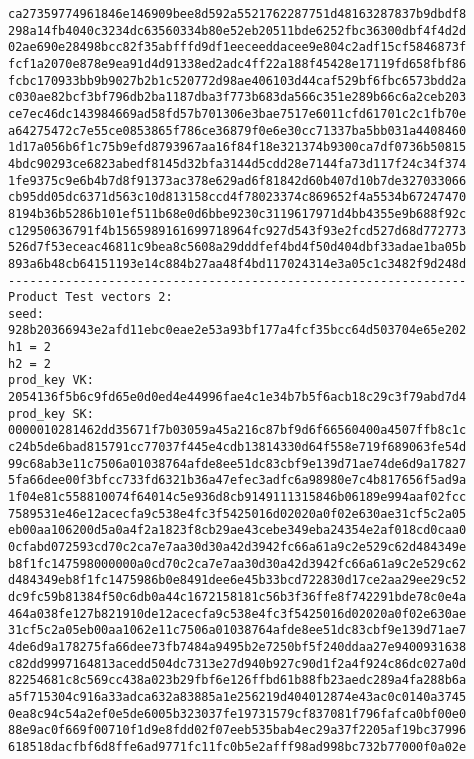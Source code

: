 \documentclass{article}
\begin{document}
{\begin{verbatim}
ca27359774961846e146909bee8d592a5521762287751d48163287837b9dbdf8
298a14fb4040c3234dc63560334b80e52eb20511bde6252fbc36300dbf4f4d2d
02ae690e28498bcc82f35abfffd9df1eeceeddacee9e804c2adf15cf5846873f
fcf1a2070e878e9ea91d4d91338ed2adc4ff22a188f45428e17119fd658fbf86
fcbc170933bb9b9027b2b1c520772d98ae406103d44caf529bf6fbc6573bdd2a
c030ae82bcf3bf796db2ba1187dba3f773b683da566c351e289b66c6a2ceb203
ce7ec46dc143984669ad58fd57b701306e3bae7517e6011cfd61701c2c1fb70e
a64275472c7e55ce0853865f786ce36879f0e6e30cc71337ba5bb031a4408460
1d17a056b6f1c75b9efd8793967aa16f84f18e321374b9300ca7df0736b50815
4bdc90293ce6823abedf8145d32bfa3144d5cdd28e7144fa73d117f24c34f374
1fe9375c9e6b4b7d8f91373ac378e629ad6f81842d60b407d10b7de327033066
cb95dd05dc6371d563c10d813158ccd4f78023374c869652f4a5534b67247470
8194b36b5286b101ef511b68e0d6bbe9230c3119617971d4bb4355e9b688f92c
c12950636791f4b1565989161699718964fc927d543f93e2fcd527d68d772773
526d7f53eceac46811c9bea8c5608a29dddfef4bd4f50d404dbf33adae1ba05b
893a6b48cb64151193e14c884b27aa48f4bd117024314e3a05c1c3482f9d248d
----------------------------------------------------------------
Product Test vectors 2:
seed:
928b20366943e2afd11ebc0eae2e53a93bf177a4fcf35bcc64d503704e65e202
h1 = 2
h2 = 2
prod_key VK:
2054136f5b6c9fd65e0d0ed4e44996fae4c1e34b7b5f6acb18c29c3f79abd7d4
prod_key SK:
0000010281462dd35671f7b03059a45a216c87bf9d6f66560400a4507ffb8c1c
c24b5de6bad815791cc77037f445e4cdb13814330d64f558e719f689063fe54d
99c68ab3e11c7506a01038764afde8ee51dc83cbf9e139d71ae74de6d9a17827
5fa66dee00f3bfcc733fd6321b36a47efec3adfc6a98980e7c4b817656f5ad9a
1f04e81c558810074f64014c5e936d8cb9149111315846b06189e994aaf02fcc
7589531e46e12acecfa9c538e4fc3f5425016d02020a0f02e630ae31cf5c2a05
eb00aa106200d5a0a4f2a1823f8cb29ae43cebe349eba24354e2af018cd0caa0
0cfabd072593cd70c2ca7e7aa30d30a42d3942fc66a61a9c2e529c62d484349e
b8f1fc147598000000a0cd70c2ca7e7aa30d30a42d3942fc66a61a9c2e529c62
d484349eb8f1fc1475986b0e8491dee6e45b33bcd722830d17ce2aa29ee29c52
dc9fc59b81384f50c6db0a44c1672158181c56b3f36ffe8f742291bde78c0e4a
464a038fe127b821910de12acecfa9c538e4fc3f5425016d02020a0f02e630ae
31cf5c2a05eb00aa1062e11c7506a01038764afde8ee51dc83cbf9e139d71ae7
4de6d9a178275fa66dee73fb7484a9495b2e7250bf5f240ddaa27e9400931638
c82dd9997164813acedd504dc7313e27d940b927c90d1f2a4f924c86dc027a0d
82254681c8c569cc438a023b29fbf6e126ffbd61b88fb23aedc289a4fa288b6a
a5f715304c916a33adca632a83885a1e256219d404012874e43ac0c0140a3745
0ea8c94c54a2ef0e5de6005b323037fe19731579cf837081f796fafca0bf00e0
88e9ac0f669f00710f1d9e8fdd02f07eeb535bab4ec29a37f2205af19bc37996
618518dacfbf6d8ffe6ad9771fc11fc0b5e2afff98ad998bc732b77000f0a02e

\end{verbatim}}
\end{document}
